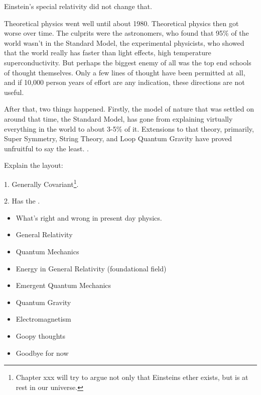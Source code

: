\documentclass[../rzero]{subfiles}
\begin{document}
Einstein's special relativity did not change that. 

Theoretical physics went well until about 1980. Theoretical physics then got worse over time. The culprits were the astronomers, who found that 95\% of the world wasn't in the Standard Model, the experimental physicists, who showed that the world really has faster than light effects, high temperature superconductivity. But perhaps the biggest enemy of all was the top end schools of thought themselves. Only a few lines of thought have been permitted at all, and if 10,000 person years of effort are any indication, these directions are not useful. 


After that, two things happened. Firstly, the model of nature that was settled on around that time, the Standard Model, has gone from explaining virtually everything in the world to about 3-5\% of it. Extensions to that theory, primarily, Super Symmetry, String Theory, and Loop Quantum Gravity have proved unfruitful to say the least. \cite{woit}\cite{SmolinTrouble}\cite{SabineLost}. 




Explain the layout:



1. Generally Covariant\footnote{Chapter xxx will try to argue not only that Einsteins ether exists, but is at rest in our universe.}.

2. Has the .


\begin{itemize}
  \item What's right and wrong in present day physics.
  \item General Relativity
  \item Quantum Mechanics
  \item Energy in General Relativity (foundational field)
  \item Emergent Quantum Mechanics
  \item Quantum Gravity
  \item Electromagnetism
  \item Goopy thoughts 
  \item Goodbye for now
\end{itemize}
\end{document}
